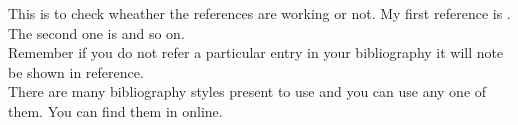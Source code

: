 \documentclass[a4paper, 12pt]{article}
\begin{document}
	
	\pagebreak
	
	This is to check wheather the references are working or not. My first reference is \cite{one}. The second one is \cite{jurafsky2000speech} and so on.\\
	
	Remember if you do not refer a particular entry in your bibliography it will note be shown in reference.\\
	
	There are many bibliography styles present to use and you can use any one of them. You can find them in online.
	
	
	
\end{document}
